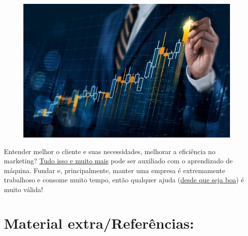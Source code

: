 \documentclass[12pt]{article}
\begin{document}
            \paragraph{}
           \begin{figure}[ht]
           \centering
           \includegraphics[scale=0.5]{ldo-3.2.jpg}
           \end{figure}
           
           Entender melhor o cliente e suas necessidades, melhorar a eficiência no
marketing? \href{https://forbes.com.br/negocios/2019/09/15-maneiras-como-o-machine-learnings-ajuda-nos-negocios/#foto11}{Tudo isso e muito mais} pode ser auxiliado com o
aprendizado de máquina. Fundar e, principalmente, manter uma
empresa é extremamente trabalhoso e consome muito tempo, então
qualquer ajuda (\href{https://epocanegocios.globo.com/Tecnologia/noticia/2019/02/startup-usa-ciencia-de-dados-para-prever-o-futuro-das-empresas-e-ajuda-las-lucrar-mais.html}{desde que seja boa}) é muito válida!

        
            \section*{\centering Material extra/Referências:}\label{sec:Extra_Referencias}

\
           
\end{document}
